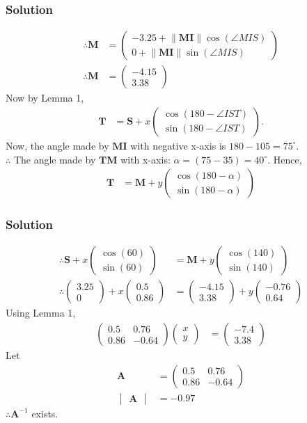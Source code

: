 \documentclass{beamer}
\theoremstyle{remark}
\providecommand{\norm}[1]{\lVert#1\rVert}
\renewcommand{\vec}[1]{\mathbf{#1}}
\newcommand{\myvec}[1]{\ensuremath{\begin{pmatrix}#1\end{pmatrix}}}
\newcommand{\mydet}[1]{\ensuremath{\begin{vmatrix}#1\end{vmatrix}}}
\begin{document}
\begin{frame}
    \frametitle{Solution}
    \begin{block}{}
        \small
        \begin{align}
            \therefore \vec{M} &= \myvec{-3.25 + \norm{{\vec{MI}}}\cos({\angle{MIS}})\\0 + \norm{\vec{MI}}\sin({\angle{MIS}})}\\
            \therefore \vec{M} &= \myvec{-4.15\\3.38}
        \end{align}
        Now by Lemma 1,
        \begin{align}
            \vec{T} &= \vec{S} + x\myvec{\cos(180-\angle IST)\\\sin(180-\angle IST)}.
        \end{align}
        Now, the angle made by $\vec{MI}$ with negative x-axis is $180-105 = 75^{\circ}$. \\
        $\therefore$ The angle made by $\vec{TM}$ with x-axis: $ \alpha = (75-35) = 40^{\circ}$.
        Hence,
        \begin{align}
            \vec{T} &= \vec{M} + y\myvec{\cos(180 - \alpha)\\ \sin(180 - \alpha)}
        \end{align}
    \end{block}
\end{frame}
\begin{frame}
\small
    \frametitle{Solution}
    \begin{block}{}
        \small
        \begin{align}
            \therefore \vec{S} +     x\myvec{\cos(60)\\\sin(60)} &= \vec{M} + y\myvec{\cos(140)\\\sin(140)}\\
            \therefore \myvec{3.25\\0} + x\myvec{0.5\\0.86} &= \myvec{-4.15 \\ 3.38} + y\myvec{-0.76\\0.64}
        \end{align}
        Using Lemma 1,
        \begin{align}
            \myvec{0.5 & 0.76\\ 0.86 & -0.64}\myvec{x\\y} &= \myvec{-7.4\\3.38} \label{eq28}
        \end{align}
        Let
        \begin{align}
            \vec{A} &= \myvec{0.5 & 0.76\\ 0.86 & -0.64}\\
            \mydet{\vec{A}} &= -0.97
        \end{align}
        $\therefore \vec{A}^{-1}$ exists. 
    \end{block}
\end{frame}
\end{document}
